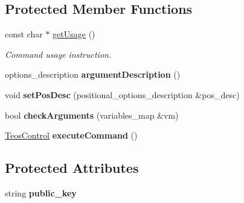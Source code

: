 \subsection*{Protected Member Functions}
\begin{DoxyCompactItemize}
\item 
const char $\ast$ \mbox{\hyperlink{classteos_1_1command_1_1_get_accounts_options_ac93b806fa601124aa899474da62d1288}{get\+Usage}} ()
\begin{DoxyCompactList}\small\item\em Command \textquotesingle{}usage\textquotesingle{} instruction. \end{DoxyCompactList}\item 
\mbox{\label{classteos_1_1command_1_1_get_accounts_options_a895c2708a09db687d738aa215fcb2ce9}} 
options\+\_\+description {\bfseries argument\+Description} ()
\item 
\mbox{\label{classteos_1_1command_1_1_get_accounts_options_af8bd3d166447f342a64f676a9d2437da}} 
void {\bfseries set\+Pos\+Desc} (positional\+\_\+options\+\_\+description \&pos\+\_\+desc)
\item 
\mbox{\label{classteos_1_1command_1_1_get_accounts_options_a3c31f6264e33997c8f17475755d69861}} 
bool {\bfseries check\+Arguments} (variables\+\_\+map \&vm)
\item 
\mbox{\label{classteos_1_1command_1_1_get_accounts_options_ad6e48fb73341c5469ce56558da5adc87}} 
\mbox{\hyperlink{classteos_1_1_teos_control}{Teos\+Control}} {\bfseries execute\+Command} ()
\end{DoxyCompactItemize}
\subsection*{Protected Attributes}
\begin{DoxyCompactItemize}
\item 
\mbox{\label{classteos_1_1command_1_1_get_accounts_options_ac25b9f603525d685116441334d61a973}} 
string {\bfseries public\+\_\+key}
\end{DoxyCompactItemize}
